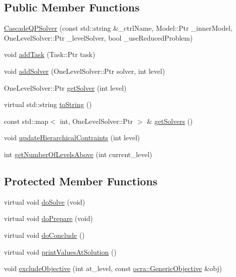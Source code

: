 \subsection*{Public Member Functions}
\begin{DoxyCompactItemize}
\item 
\hyperlink{classocra_1_1CascadeQPSolver_a85f1b7a863230a61f0bc3ce9ab93a908}{Cascade\+Q\+P\+Solver} (const std\+::string \&\+\_\+ctrl\+Name, Model\+::\+Ptr \+\_\+inner\+Model, One\+Level\+Solver\+::\+Ptr \+\_\+level\+Solver, bool \+\_\+use\+Reduced\+Problem)
\item 
void \hyperlink{classocra_1_1CascadeQPSolver_a42c413b6eeef99c2bdee577991f1e9a4}{add\+Task} (Task\+::\+Ptr task)
\item 
void \hyperlink{classocra_1_1CascadeQPSolver_af0c103a167f7c63adcfb28af29bae544}{add\+Solver} (One\+Level\+Solver\+::\+Ptr solver, int level)
\item 
One\+Level\+Solver\+::\+Ptr \hyperlink{classocra_1_1CascadeQPSolver_a7c0dff6ffa567d1bf6663bbc45fc22d4}{get\+Solver} (int level)
\item 
virtual std\+::string \hyperlink{classocra_1_1CascadeQPSolver_a411f14ee5770be6a3f04d665ac844e6c}{to\+String} ()
\item 
const std\+::map$<$ int, One\+Level\+Solver\+::\+Ptr $>$ \& \hyperlink{classocra_1_1CascadeQPSolver_a2f433d5b3029e998396c7d40fba6caa5}{get\+Solvers} ()
\item 
void \hyperlink{classocra_1_1CascadeQPSolver_afeca9e40c6424236d4527d4c1b97fe51}{update\+Hierarchical\+Contraints} (int level)
\item 
int \hyperlink{classocra_1_1CascadeQPSolver_aa943fac9f6ab708fc0d5d80977878d20}{get\+Number\+Of\+Levels\+Above} (int current\+\_\+level)
\end{DoxyCompactItemize}
\subsection*{Protected Member Functions}
\begin{DoxyCompactItemize}
\item 
virtual void \hyperlink{classocra_1_1CascadeQPSolver_aea57e3bc9dabe277161d742af5cd88dc}{do\+Solve} (void)
\item 
virtual void \hyperlink{classocra_1_1CascadeQPSolver_a2ccca21b47e23667be94cd215c890d5e}{do\+Prepare} (void)
\item 
virtual void \hyperlink{classocra_1_1CascadeQPSolver_af180fd8b7323b29246512af6109845d2}{do\+Conclude} ()
\item 
virtual void \hyperlink{classocra_1_1CascadeQPSolver_a1f4c5d709ce4545c596c864b1d99d08c}{print\+Values\+At\+Solution} ()
\item 
void \hyperlink{classocra_1_1CascadeQPSolver_a9308f8943177b4ea78e7f15a3ab55832}{exclude\+Objective} (int at\+\_\+level, const \hyperlink{namespaceocra_a37a91885f4fa5c523d22cb15d5673062}{ocra\+::\+Generic\+Objective} \&obj)
\end{DoxyCompactItemize}
